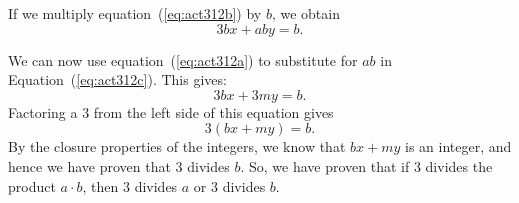 \begin{enumerate}
\begin{enumerate}
\begin{myproof}
If we multiply equation~(\ref{eq:act312b}) by  $b$, we obtain
\begin{equation} \label{eq:act312c}
3bx + aby = b.
\end{equation}

We can now use equation~(\ref{eq:act312a}) to substitute for  $a b$ in 
Equation~(\ref{eq:act312c}).  This gives:
\[
3bx + 3my = b.
\]
Factoring a  3  from the left side of this equation gives 
\[
3\left( {bx + my} \right) = b.
\]
By the closure properties of the integers, we know that  $bx + my$ is an integer, and hence we have proven that  3 divides  $b$.  So, we have proven that if  3  divides the product  
$a \cdot b$, then  3  divides  $a$  or  3  divides  $b$.
\end{myproof}
\end{enumerate}

\end{enumerate}


\hbreak

\endinput
